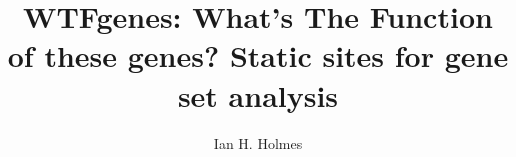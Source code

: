 \documentclass{article}
\begin{document}
\newcommand\structabs[5]{\maketitle \abstract{#1 #2 #3 Contact: #4}}

\title{WTFgenes: What's The Function of these genes? Static sites for gene set analysis}
\author{Ian H. Holmes}


\end{document}
